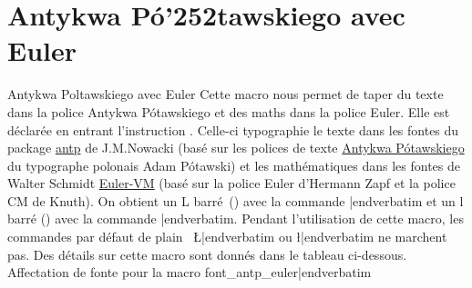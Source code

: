 \BlackBoxes								
									






   \fontss
\section{\sixteenbf\fontss Antykwa P\'o\char'252tawskiego avec Euler}{Antykwa Poltawskiego avec Euler}
\sample
\ii Cette macro nous permet de taper du texte dans la police Antykwa P\'o\lstroke{}tawskiego et des maths dans la police Euler. Elle est d\'eclar\'ee en entrant l'instruction {\color{brown}\verbatim}. Celle-ci typographie le texte dans les fontes du package  \href{http://www.tex.ac.uk/tex-archive/help/Catalogue/entries/antp.html}{antp} de J.\;M.\;No\-wacki (bas\'e sur les polices de texte  \href{http://nowacki.strefa.pl/poltawski-e.html}{Antykwa P\'o\lstroke{}tawskiego} du typographe polonais Adam P\'o\lstroke{}tawski) et les math\'ematiques dans les fontes de Walter Schmidt \href{http://www.tex.ac.uk/tex-archive/help/Catalogue/entries/eulervm.html}{Euler-VM} (bas\'e sur la police Euler d'Hermann Zapf et la police CM de Knuth). On obtient un L barr\'e~(\Lstroke) avec la commande {\color{brown}\verbatim\Lstroke|endverbatim} et un l barr\'e (\lstroke) avec la commande {\color{brown}\verbatim\lstroke|endverbatim}. Pendant l'utilisation de cette macro, les commandes par d\'efaut de plain \capstex\ {\color{brown}\verbatim\L|endverbatim} ou {\color{brown}\verbatim\l|endverbatim} ne marchent pas. Des d\'etails sur cette macro sont donn\'es dans le tableau ci-dessous.
\bs
\hfil{Affectation de fonte pour la macro {\color{brown}\verbatim font_antp_euler|endverbatim}}\hfil

